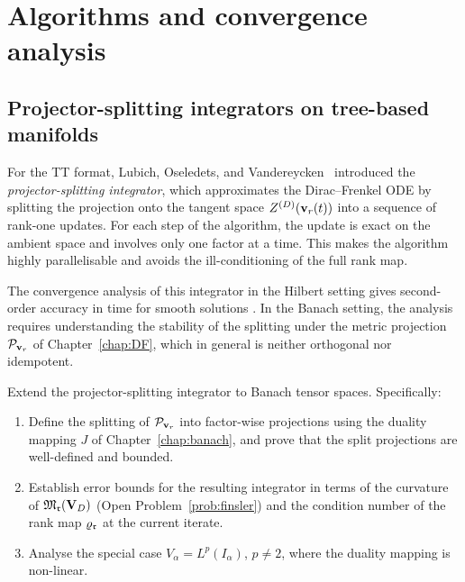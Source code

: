 \section{Algorithms and convergence analysis}
\label{sec:open:algorithms}

\subsection*{Projector-splitting integrators on tree-based manifolds}

For the TT format, Lubich, Oseledets, and
Vandereycken~\cite{LubichOseledetsVandereycken2015} introduced the
\emph{projector-splitting integrator}, which approximates the Dirac--Frenkel
ODE by splitting the projection onto the tangent space $Z^{(D)}(\mathbf{v}_r(t))$
into a sequence of rank-one updates. For each step of the algorithm,
the update is exact on the ambient space and involves only one factor at
a time. This makes the algorithm highly parallelisable and avoids the
ill-conditioning of the full rank map.

The convergence analysis of this integrator in the Hilbert setting gives
second-order accuracy in time for smooth solutions
\cite{LubichOseledetsVandereycken2015}. In the Banach setting, the
analysis requires understanding the stability of the splitting under the
metric projection $\mathcal{P}_{\mathbf{v}_r}$ of Chapter~\ref{chap:DF}, which in
general is neither orthogonal nor idempotent.

\begin{problem}
\label{prob:integrator}
Extend the projector-splitting integrator to Banach tensor spaces.
Specifically:
\begin{enumerate}
\item[\textup{(a)}] Define the splitting of $\mathcal{P}_{\mathbf{v}_r}$ into
    factor-wise projections using the duality mapping $J$ of
    Chapter~\ref{chap:banach}, and prove that the split projections
    are well-defined and bounded.
\item[\textup{(b)}] Establish error bounds for the resulting integrator
    in terms of the curvature of $\mathfrak{M}_{\mathfrak{r}}(\mathbf{V}_D)$ (Open
    Problem~\ref{prob:finsler}) and the condition number of the rank
    map $\varrho_{\mathfrak{r}}$ at the current iterate.
\item[\textup{(c)}] Analyse the special case $V_\alpha = L^p(I_\alpha)$,
    $p \neq 2$, where the duality mapping is non-linear.
\end{enumerate}
\end{problem}

